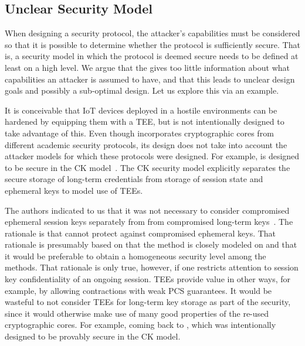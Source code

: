 \documentclass[runningheads, envcountsame, a4paper, draft, x11names]{llncs}
\newcommand{\spacehack}{\vspace{-1em}}
\begin{document}
\subsection{Unclear Security Model}
When designing a security protocol, the attacker's capabilities must be
considered so that it is possible to determine whether the protocol is
sufficiently secure.
%
That is, a security model in which the protocol is deemed
secure needs to be defined at least on a high level.
%
We argue that the \mSpec{} gives too little information about what capabilities
an attacker is assumed to have, and that this leads to unclear design goals and
possibly a sub-optimal design.
%
Let us explore this via an example.
%

It is conceivable that IoT devices deployed in a hostile environments can be
hardened by equipping them with a TEE, but \mEdhoc{} is not intentionally
designed to take advantage of this.
%
Even though \mEdhoc{} incorporates cryptographic cores from different academic
security protocols, its design does not take into account the attacker models
for which these protocols were designed.
%
For example, \mOptls{} is designed to be secure in the CK
model~\cite{DBLP:conf/crypto/CanettiK02}.
%
The CK security model explicitly separates the secure storage of long-term
credentials from storage of session state and ephemeral keys to model
use of TEEs.
%

The \mEdhoc{} authors indicated to us that it was
not necessary to consider compromised ephemeral session keys separately from
from compromised long-term keys~\cite{personalCommunication}.
%
The rationale is that \mSigma{} cannot protect against compromised ephemeral
keys.
%
That rationale is presumably based on that the \mSigSig{} method is
closely modeled on \mSigmaI{} and that it would be preferable to obtain a
homogeneous security level among the \mEdhoc{}
methods\cite{personalCommunication}.
%
That rationale is only true, however, if one restricts attention to session key
confidentiality of an ongoing session.
%
TEEs provide value in other ways, for example, by allowing contractions with
weak PCS guarantees.
%
It would be wasteful to not consider TEEs for long-term key storage as part of
the security, since it would otherwise make use of many good properties of the
re-used cryptographic cores.
%
For example, coming back to \mOptls{}, which was intentionally
designed to be provably secure in the CK model.
%

\spacehack
\end{document}
